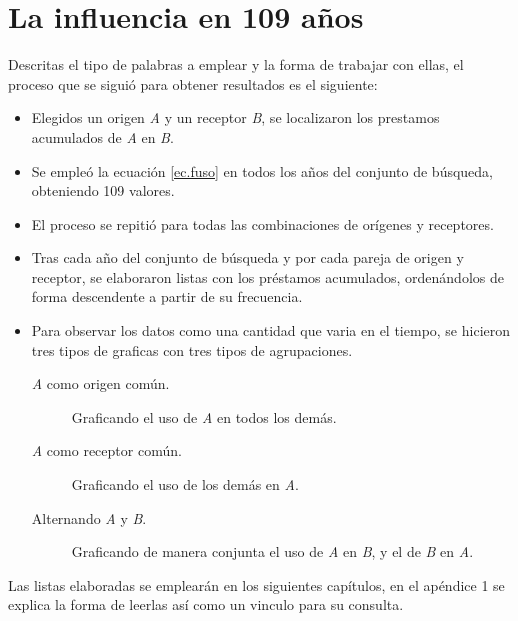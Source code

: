 \section{La influencia en 109 años} %

Descritas el tipo de palabras a emplear y la forma de trabajar con ellas, el proceso que se siguió para obtener resultados es el siguiente: 

\begin{itemize}
	
	\item Elegidos un  origen \textit{A} y un receptor \textit{B}, se localizaron los prestamos acumulados de \textit{A} en \textit{B}.
	
	\item Se empleó la ecuación \ref{ec.fuso} en todos los años del conjunto de búsqueda, obteniendo 109 valores. 
	
	\item El proceso se repitió para todas las combinaciones de orígenes y receptores.
	
	\item  Tras cada año del conjunto de búsqueda y por cada pareja de origen y receptor, se elaboraron  listas con los préstamos acumulados, ordenándolos de forma descendente a partir de su frecuencia. 
	
	\item Para observar los datos como una cantidad que varia en el tiempo, se  hicieron tres tipos de graficas con tres tipos de agrupaciones.
	
	\begin{description}
		
		\item[\textit{A} como origen común.] Graficando el uso de \textit{A} en todos los demás.
		
		\item[\textit{A} como receptor común.] Graficando el uso de los demás en \textit{A}.
		
		\item[Alternando \textit{A} y \textit{B}.]  Graficando de manera conjunta el uso de \textit{A} en \textit{B}, y el de \textit{B} en \textit{A}.
				
	\end{description}	

\end{itemize}

Las listas elaboradas se emplearán en los siguientes capítulos, en el apéndice 1 se explica la forma de leerlas así como un vinculo para su consulta. 

